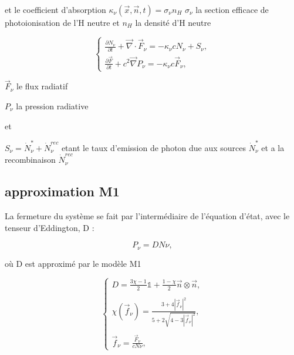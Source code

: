 et le coefficient d'absorption $\kappa_\nu(\vec{x},\vec{n},t) = \sigma_\nu n_H$ 
$\sigma_\nu$ la section efficace de photoionisation de l'H neutre et $n_H$ la densité d'H neutre


\begin{equation}
\begin{cases}

\frac{ \partial N_\nu }{ \partial t } + \vec{\nabla} \cdot \vec{F}_\nu = -\kappa_\nu c  N_\nu + S_\nu,\\

\frac{ \partial \vec{F} }{ \partial t } + c^2 \vec{\nabla} P_\nu = -\kappa_\nu c \vec{F}_\nu ,

\end{cases}
\label{eq:densite_energie}
\end{equation}

$\vec{F}_\nu$ le flux radiatif

$P_\nu $ la pression radiative

et 

$S_\nu = \dot{N}_\nu^* + \dot{N}_\nu^{rec}$ etant le taux d'emission de photon due aux sources $\dot{N}_\nu^*$ et a la recombinaison $ \dot{N}_\nu^{rec}$


\subsection{approximation M1}
La fermeture du système se fait par l’intermédiaire de l’équation
d’état, avec le tenseur d’Eddington, D :

\begin{equation}
 P_\nu = D N\nu ,
\label{eq:fermeture}
\end{equation}

où D est approximé par le modèle M1 \citep{levermore1984}%

\begin{equation}
\begin{cases}

D = \frac{ 3\chi -1 }{2} \mathbb{1} + \frac{ 1 - \chi }{2} \vec{n} \otimes \vec{n} , \\
\\
\chi(\vec{f}_\nu) = \frac{ 3+4 |\vec{f}_\nu|^2 }{5+2\sqrt{4-3|\vec{f}_\nu|^2}} , \\
\\
\vec{f}_\nu = \frac{ \vec{F}_\nu }{c N\nu }  ,

\end{cases}
\label{eq:tenseur}
\end{equation}

